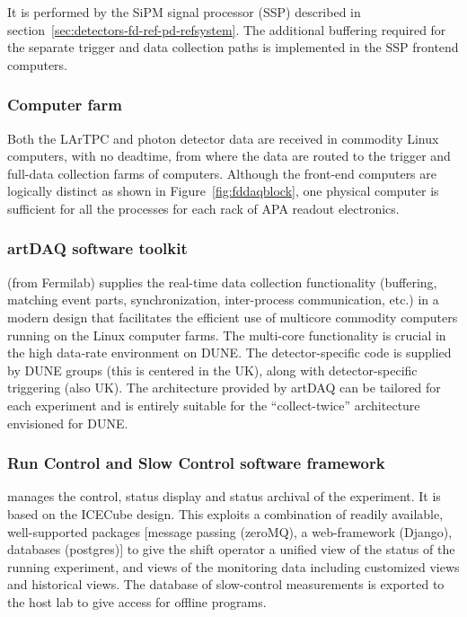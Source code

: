 It  is performed by the SiPM signal processor (SSP) described in
section~\ref{sec:detectors-fd-ref-pd-refsystem}.  The additional
buffering required for the separate trigger and data collection paths
is implemented in the SSP frontend computers.

\subsubsection{Computer farm}
Both the LArTPC and photon detector data are
received in commodity Linux computers, with no deadtime, from where
the data are routed to the trigger and full-data collection farms of
computers.  Although the front-end computers are logically distinct as
shown in Figure~\ref{fig:fddaqblock}, one physical computer is
sufficient for all the processes for each rack of APA readout
electronics. 

\subsubsection{artDAQ software toolkit}

(from Fermilab) supplies the real-time
data collection functionality (buffering, matching event parts,
synchronization, inter-process communication, etc.) in a modern
design that facilitates the efficient use of multicore commodity
computers running on the Linux computer farms.  The multi-core
functionality is crucial in the high data-rate environment on DUNE.  
The detector-specific
code is supplied by DUNE groups (this is centered in the UK), along
with detector-specific triggering (also UK).  The architecture
provided by artDAQ can be tailored for each experiment and is entirely
suitable for the ``collect-twice'' architecture envisioned for DUNE.

\subsubsection{ Run Control and Slow Control software framework}

manages the
control, status display and status archival of the experiment.  It is
based on the ICECube design.  This
exploits a combination of readily available, well-supported packages
[message passing (zeroMQ), a web-framework (Django), databases (postgres)] 
to give the shift operator a unified view of the status
of the running experiment, and views of the monitoring data including
customized views and historical views.  The database of slow-control
measurements is exported to the host lab to give access for offline
programs.

